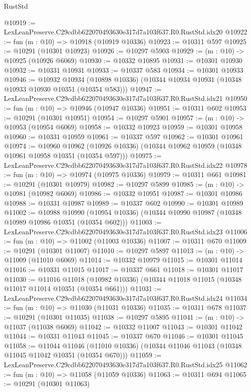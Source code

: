 \begin{lexlean}{RustStd}
\begin{coremodule}
@10919 := LexLeanPreserve.C29cdbb622070493630e317d7a103f637.R0.RustStd.idx20
@10922 := fun (m : @10) => @10918 (@10919 @10336)
@10923 := @10311 @597
@10925 := @10291 (@10301 @10923)
@10926 := @10297 @5903
@10929 := (m : @10) -> @10925 (@10926 @6069)
@10930 := @10332 @10895
@10931 := @10301 @10930
@10932 := @10331 @10931
@10933 := @10337 @583
@10934 := @10301 @10933
@10946 := @10932
    @10934
    (@10898 @10336)
    (@10344 @10934 @10931 (@10348 @10933 @10930 @10351 (@10354 @583)))
@10947 := LexLeanPreserve.C29cdbb622070493630e317d7a103f637.R0.RustStd.idx21
@10950 := fun (m : @10) => @10946 (@10947 @10336)
@10951 := @10311 @602
@10953 := @10291 (@10301 @10951)
@10954 := @10297 @5901
@10957 := (m : @10) -> @10953 (@10954 @6069)
@10958 := @10332 @10923
@10959 := @10301 @10958
@10960 := @10331 @10959
@10961 := @10337 @597
@10962 := @10301 @10961
@10974 := @10960
    @10962
    (@10926 @10336)
    (@10344 @10962 @10959 (@10348 @10961 @10958 @10351 (@10354 @597)))
@10975 := LexLeanPreserve.C29cdbb622070493630e317d7a103f637.R0.RustStd.idx22
@10978 := fun (m : @10) => @10974 (@10975 @10336)
@10979 := @10311 @661
@10981 := @10291 (@10301 @10979)
@10982 := @10297 @5899
@10985 := (m : @10) -> @10981 (@10982 @6069)
@10986 := @10332 @10951
@10987 := @10301 @10986
@10988 := @10331 @10987
@10989 := @10337 @602
@10990 := @10301 @10989
@11002 := @10988
    @10990
    (@10954 @10336)
    (@10344 @10990 @10987 (@10348 @10989 @10986 @10351 (@10354 @602)))
@11003 := LexLeanPreserve.C29cdbb622070493630e317d7a103f637.R0.RustStd.idx23
@11006 := fun (m : @10) => @11002 (@11003 @10336)
@11007 := @10311 @670
@11009 := @10291 (@10301 @11007)
@11010 := @10297 @5897
@11013 := (m : @10) -> @11009 (@11010 @6069)
@11014 := @10332 @10979
@11015 := @10301 @11014
@11016 := @10331 @11015
@11017 := @10337 @661
@11018 := @10301 @11017
@11030 := @11016
    @11018
    (@10982 @10336)
    (@10344 @11018 @11015 (@10348 @11017 @11014 @10351 (@10354 @661)))
@11031 := LexLeanPreserve.C29cdbb622070493630e317d7a103f637.R0.RustStd.idx24
@11034 := fun (m : @10) => @11030 (@11031 @10336)
@11035 := @10311 @678
@11037 := @10291 (@10301 @11035)
@11038 := @10297 @5895
@11041 := (m : @10) -> @11037 (@11038 @6069)
@11042 := @10332 @11007
@11043 := @10301 @11042
@11044 := @10331 @11043
@11045 := @10337 @670
@11046 := @10301 @11045
@11058 := @11044
    @11046
    (@11010 @10336)
    (@10344 @11046 @11043 (@10348 @11045 @11042 @10351 (@10354 @670)))
@11059 := LexLeanPreserve.C29cdbb622070493630e317d7a103f637.R0.RustStd.idx25
@11062 := fun (m : @10) => @11058 (@11059 @10336)
@11063 := @10311 @694
@11065 := @10291 (@10301 @11063)

\end{coremodule}
\end{lexlean}

